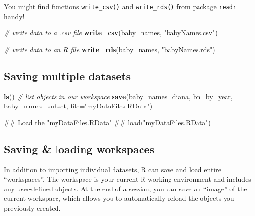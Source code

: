 \documentclass[]{book}
\newenvironment{Shaded}{\begin{snugshade}}{\end{snugshade}}
\newcommand{\KeywordTok}[1]{\textcolor[rgb]{0.13,0.29,0.53}{\textbf{#1}}}
\newcommand{\DataTypeTok}[1]{\textcolor[rgb]{0.13,0.29,0.53}{#1}}
\newcommand{\StringTok}[1]{\textcolor[rgb]{0.31,0.60,0.02}{#1}}
\newcommand{\CommentTok}[1]{\textcolor[rgb]{0.56,0.35,0.01}{\textit{#1}}}
\newcommand{\NormalTok}[1]{#1}
\begin{document}
You might find functions \texttt{write\_csv()} and \texttt{write\_rds()}
from package \texttt{readr} handy!

\begin{Shaded}
\begin{Highlighting}[]
\CommentTok{# write data to a .csv file}
\KeywordTok{write_csv}\NormalTok{(baby_names, }\StringTok{"babyNames.csv"}\NormalTok{)}
\end{Highlighting}
\end{Shaded}

\begin{Shaded}
\begin{Highlighting}[]
\CommentTok{# write data to an R file}
\KeywordTok{write_rds}\NormalTok{(baby_names, }\StringTok{"babyNames.rds"}\NormalTok{)}
\end{Highlighting}
\end{Shaded}

\subsection{Saving multiple datasets}\label{saving-multiple-datasets}

\begin{Shaded}
\begin{Highlighting}[]
\KeywordTok{ls}\NormalTok{() }\CommentTok{# list objects in our workspace}
\KeywordTok{save}\NormalTok{(baby_names_diana, bn_by_year, baby_names_subset, }\DataTypeTok{file=}\StringTok{"myDataFiles.RData"}\NormalTok{)  }
\end{Highlighting}
\end{Shaded}

\begin{Shaded}
\begin{Highlighting}[]
\NormalTok{## Load the "myDataFiles.RData"}
\NormalTok{## load("myDataFiles.RData") }
\end{Highlighting}
\end{Shaded}

\subsection{Saving \& loading
workspaces}\label{saving-loading-workspaces}

In addition to importing individual datasets, R can save and load entire
``workspaces''. The workspace is your current R working environment and
includes any user-defined objects. At the end of a session, you can save
an ``image'' of the current workspace, which allows you to automatically
reload the objects you previously created.
\end{document}
